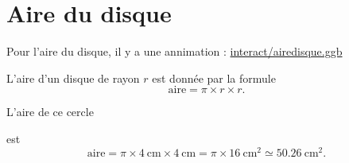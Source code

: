 \section{Aire du disque}


Pour l'aire du disque, il y a une annimation\cite{RHJUooRIQIuv} :
\url{interact/airedisque.ggb}

\begin{propriete}
    L'aire d'un disque de rayon \( r\) est donnée par la formule
    \begin{equation}
        \text{aire}=\pi\times r\times r.
    \end{equation}
\end{propriete}

\begin{example}

    L'aire de ce cercle
    \begin{center}
        
    \end{center}
    est 
    \begin{equation}
        \text{aire}=\pi\times \SI{4}{\centi\meter}\times \SI{4}{\centi\meter}=\pi\times \SI{16}{\centi\meter\squared}\simeq \SI{50.26}{\centi\meter\squared}.
    \end{equation}

\end{example}


